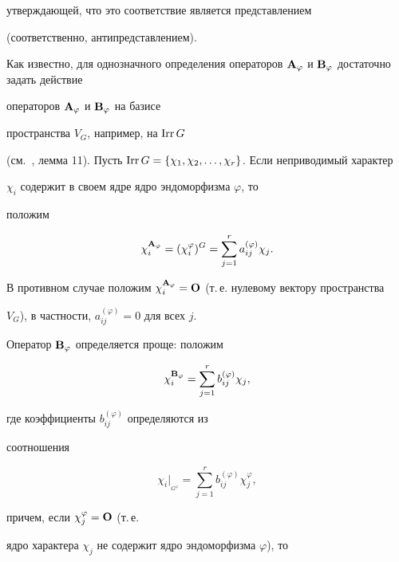 утверждающей, что это соответствие является представлением


(соответственно, антипредставлением).





Как известно, для однозначного определения операторов $\bold


A_{\varphi}$ и $\bold B_{\varphi}$ достаточно задать действие


операторов $\bold A_{\varphi}$ и $\bold B_{\varphi}$ на базисе


пространства $V_{G}$, например, на $\operatorname{Irr} G$


(см.~\cite{BelFomin}, лемма 11). Пусть $\Irr


G=\{\chi_{1},\chi_{2},\dotsc,\chi_{r}\}$. Если неприводимый характер


$\chi_{i}$ содержит в своем ядре ядро эндоморфизма $\varphi$, то


положим


$$


\chi^{\bold A_\varphi}_{i}= (\chi^{\varphi}_{i})^{G}=


\sum\limits^{r}_{j=1}a^{(\varphi)}_{ij}\chi_{j}.


$$


В противном случае положим $\chi^{\bold A_\varphi}_{i}=


\bold O$ (т.\,е. нулевому вектору пространства


$V_{G}$), в частности, $a^{(\varphi)}_{ij}=0$ для всех $j$.





Оператор ${\bold B}_{\varphi}$ определяется проще: положим


$$


\chi^{{\bold B}_{\varphi}}_{i}=


\sum\limits^{r}_{j=1}b^{(\varphi)}_{ij}\chi_{j},


$$


где коэффициенты $b^{(\varphi)}_{ij}$ определяются из


соотношения


$$


\chi_{i}\big|_{_{G^{\varphi}}}=


\sum\limits^{r}_{j=1}b^{(\varphi)}_{ij}\chi^{\varphi}_{j},


$$


причем, если $\chi^{\varphi}_{j}={\bold O}$ (т.\,е.


ядро характера $\chi_{j}$ не содержит ядро эндоморфизма $\varphi$), то


